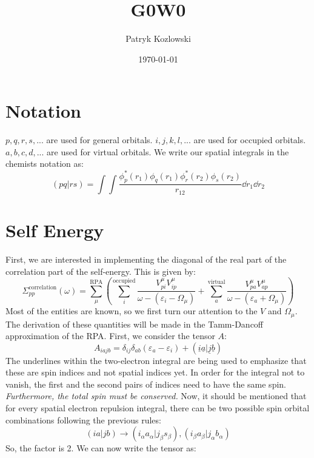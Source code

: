 \documentclass[12pt]{article}
\author{Patryk Kozlowski}
\title{G0W0}
\date{\today}
\begin{document}
\maketitle
\section{Notation}
$p,q,r,s,...$ are used for general orbitals. $i,j,k,l,...$ are used for occupied orbitals. $a,b,c,d,...$ are used for virtual orbitals. We write our spatial integrals in the chemists notation as:
\begin{equation}
    (pq|rs) = \int \int \frac{\phi _{p}^{*}(r_{1}) \phi _{q}(r_{1}) \phi _{r}^{*}(r_{2}) \phi _{s}(r_{2})}{r_{12}} \dd r _{1} \dd r _{2}
\end{equation}
\section{Self Energy}
First, we are interested in implementing the diagonal of the real part of the correlation part of the self-energy. This is given by:
\begin{equation}
    \Sigma_{pp}^{\text{correlation}}(\omega) = \sum_{\mu }^{\text{RPA}}\left(\sum_{i}^{\text{occupied}} \frac{V_{pi}^{\mu }V_{ip}^{\mu }}{\omega -(\varepsilon _{i}-\Omega  _{\mu })}+ \sum_{a}^{\text{virtual}} \frac{V_{pa}^{\mu }V_{ap}^{\mu }}{\omega -(\varepsilon _{a}+\Omega  _{\mu })}\right)
\end{equation}
Most of the entities are known, so we first turn our attention to the $V$ and $\Omega_{\mu }$. The derivation of these quantities will be made in the Tamm-Dancoff approximation of the RPA. First, we consider the tensor $A$:
\begin{equation}
    A_{iajb}=\delta _{ij} \delta _{ab} \left(\varepsilon _{a}-\varepsilon _{i}\right) + (\underline{i} \underline{a} | \underline{j} \underline{b} )
\end{equation}
The underlines within the two-electron integral are being used to emphasize that these are spin indices and not spatial indices yet. In order for the integral not to vanish, the first and the second pairs of indices need to have the same spin. \emph{Furthermore, the total spin must be conserved.} Now, it should be mentioned that for every spatial electron repulsion integral, there can be two possible spin orbital combinations following the previous rules:
\begin{equation}
    (ia|jb) \rightarrow (i_{\alpha }a_{\alpha }|j_{\beta }s_{\beta }) , (i_{\beta }a_{\beta }|j_{\alpha }b_{\alpha })
\end{equation}
So, the factor is 2. We can now write the tensor as:
\end{document}
